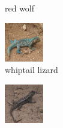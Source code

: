 \documentclass[10pt,twocolumn,letterpaper]{article}
\begin{document}
\begin{figure}
\begin{subfigure}[t]{0.3\linewidth}
        \caption*{red wolf}
    \end{subfigure}
    \begin{subfigure}[t]{0.3\linewidth}\centering
    \includegraphics[width=\textwidth]{images/41.png}
    \caption*{whiptail lizard}
    \end{subfigure}
    \begin{subfigure}[t]{0.3\linewidth}\centering
        \includegraphics[width=\textwidth]{images/44.png}

\end{subfigure}
\end{figure}
\end{document}
